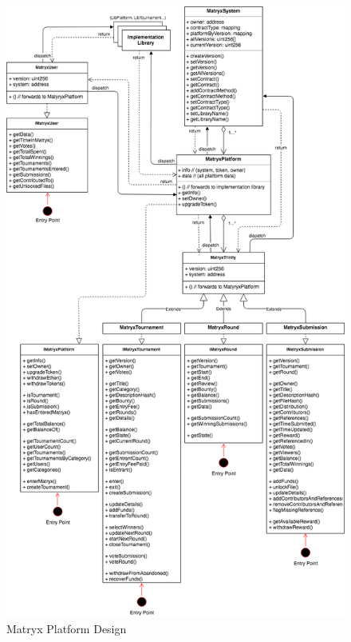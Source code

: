 \documentclass[a4paper, 10pt, conference]{ieeeconf}      %
\begin{document}
\begin{figure}
\caption{Matryx Platform Design}
\label{Platformdesign}
\centering
\includegraphics[scale = .5]{../Figures/MatryxArchitecture2018-MatryxPlatform.png}
\end{figure}
\end{document}
